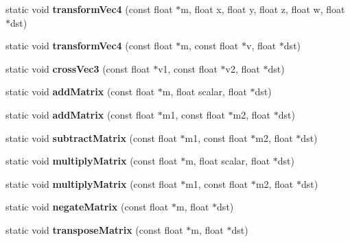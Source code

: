 \begin{DoxyCompactItemize}
static void {\bfseries transform\+Vec4} (const float $\ast$m, float x, float y, float z, float w, float $\ast$dst)
\item 
\mbox{\label{classMathUtilNeon64_ab19a311cb82d1dab1c08d6d26459b930}} 
static void {\bfseries transform\+Vec4} (const float $\ast$m, const float $\ast$v, float $\ast$dst)
\item 
\mbox{\label{classMathUtilNeon64_a732d933f97d20a4b4abafd3cc6cadc3e}} 
static void {\bfseries cross\+Vec3} (const float $\ast$v1, const float $\ast$v2, float $\ast$dst)
\item 
\mbox{\label{classMathUtilNeon64_a3182dd530b72de6478b7bc61b0adbb0d}} 
static void {\bfseries add\+Matrix} (const float $\ast$m, float scalar, float $\ast$dst)
\item 
\mbox{\label{classMathUtilNeon64_a71c5a27263ccf9e0ad072a1c8b071188}} 
static void {\bfseries add\+Matrix} (const float $\ast$m1, const float $\ast$m2, float $\ast$dst)
\item 
\mbox{\label{classMathUtilNeon64_a8e7e32ed78f21de846a1885352bd9d7a}} 
static void {\bfseries subtract\+Matrix} (const float $\ast$m1, const float $\ast$m2, float $\ast$dst)
\item 
\mbox{\label{classMathUtilNeon64_ab5dd64f8eff09d847453e259c55c8309}} 
static void {\bfseries multiply\+Matrix} (const float $\ast$m, float scalar, float $\ast$dst)
\item 
\mbox{\label{classMathUtilNeon64_a69e5e8d4988630ff122207c6a9a931f8}} 
static void {\bfseries multiply\+Matrix} (const float $\ast$m1, const float $\ast$m2, float $\ast$dst)
\item 
\mbox{\label{classMathUtilNeon64_afe0387ef01768392266c738ff917185d}} 
static void {\bfseries negate\+Matrix} (const float $\ast$m, float $\ast$dst)
\item 
\mbox{\label{classMathUtilNeon64_abe469a2878a175d9b178b54d5c65b516}} 
static void {\bfseries transpose\+Matrix} (const float $\ast$m, float $\ast$dst)

\end{DoxyCompactItemize}
